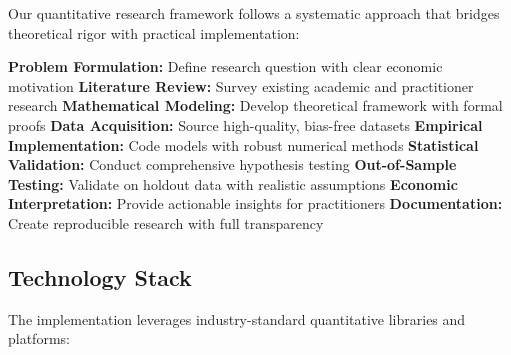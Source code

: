 \documentclass[12pt,a4paper]{article}
\begin{document}
Our quantitative research framework follows a systematic approach that bridges theoretical rigor with practical implementation:

\begin{algorithm}[H]
\caption{Quantitative Research Methodology}
\begin{algorithmic}[1]
\STATE \textbf{Problem Formulation:} Define research question with clear economic motivation
\STATE \textbf{Literature Review:} Survey existing academic and practitioner research
\STATE \textbf{Mathematical Modeling:} Develop theoretical framework with formal proofs
\STATE \textbf{Data Acquisition:} Source high-quality, bias-free datasets
\STATE \textbf{Empirical Implementation:} Code models with robust numerical methods
\STATE \textbf{Statistical Validation:} Conduct comprehensive hypothesis testing
\STATE \textbf{Out-of-Sample Testing:} Validate on holdout data with realistic assumptions
\STATE \textbf{Economic Interpretation:} Provide actionable insights for practitioners
\STATE \textbf{Documentation:} Create reproducible research with full transparency
\end{algorithmic}
\end{algorithm}

\subsection{Technology Stack}

The implementation leverages industry-standard quantitative libraries and platforms:
\end{document}
